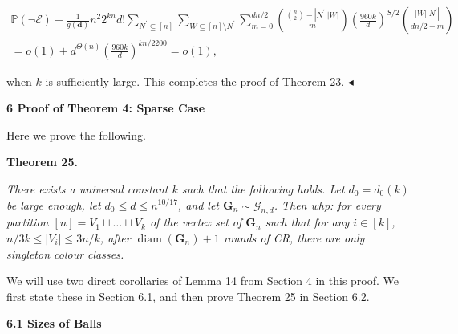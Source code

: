 \[\begin{gathered}
\mathbb{P}(\neg\mathcal{E})+\frac{1}{g(\mathbf{d})}n^{2}2^{kn}d!\sum_{N^{\prime}\subseteq[n]}\sum_{W\subseteq[n]\setminus N^{\prime}}\sum_{m=0}^{dn/2}\binom{\binom{n}{2}-|N^{\prime}||W|}{m}\left(\frac{960k}{d}\right)^{S/2}\binom{|W||N^{\prime}|}{dn/2-m}\\
=o(1)+d^{\Theta(n)}\left(\frac{960k}{d}\right)^{kn/2200}=o(1),
\end{gathered}\]


when $k$ is sufficiently large. This completes the proof of Theorem 23.
$\blacktriangleleft$\par






\par\medskip\noindent\textbf{
6 Proof of Theorem 4: Sparse Case}\par




Here we prove the following.\par





\par\medskip\noindent\textbf{
\textbf{Theorem 25}\textbf{.}
}\par



\emph{There exists a universal constant $k$ such that the following holds. Let $d_{0}=d_{0}(k)$ be large enough, let $d_{0}\leq d\leq n^{10/17}$, and let $\mathbf{G}_{n}\sim\mathcal{G}_{n,d}$.
Then whp: for every partition $[n]=V_{1}\sqcup\ldots\sqcup V_{k}$ of the vertex set of $\mathbf{G}_{n}$ such that for any $i\in[k]$, $n/3k\leq|V_{i}|\leq 3n/k$, after $\operatorname{diam}(\mathbf{G}_{n})+1$ rounds of CR, there are only singleton colour classes.}\par






We will use two direct corollaries of Lemma 14 from Section 4 in this proof. We first state these in Section 6.1, and then prove Theorem 25 in Section 6.2.\par




\par\medskip\noindent\textbf{
6.1 Sizes of Balls}\par




